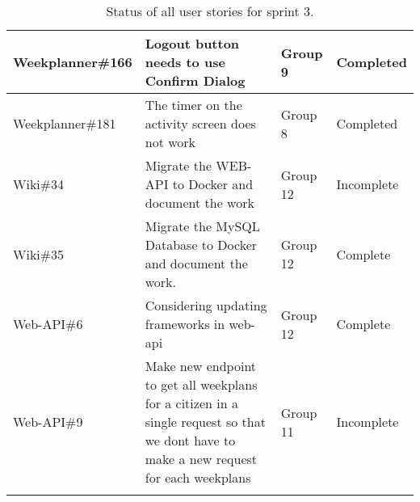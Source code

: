 \begin{longtable}{|p{2.9cm}|p{8cm}|p{2cm}|p{2cm}|}
    Weekplanner\#166 & Logout button needs to use Confirm Dialog                                                                                                                                             & Group 9        & Completed     \\ \hline
    Weekplanner\#181 & The timer on the activity screen does not work                                                                                                                                         & Group 8       & Completed    \\ \hline
    Wiki\#34         & Migrate the WEB-API to Docker and document the work                                                                                                                                     & Group 12     & Incomplete    \\ \hline
    Wiki\#35         & Migrate the MySQL Database to Docker and document the work.                                                                                                                            & Group 12      & Complete   \\ \hline
    Web-API\#6      & Considering updating frameworks in web-api                                                                                                                                            & Group 12        & Complete    \\ \hline
    Web-API\#9      & Make new endpoint to get all weekplans for a citizen in a single request so that we dont have to make a new request for each weekplans                                                & Group 11        & Incomplete    \\ \hline
    \caption{Status of all user stories for sprint 3.}\label{table:sprint-3-review}
\end{longtable}


